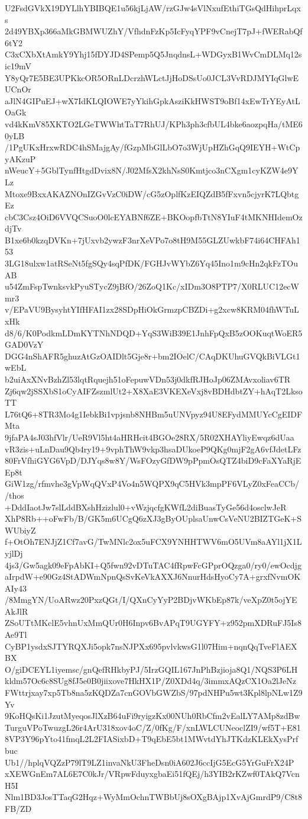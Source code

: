 U2FsdGVkX19DYLlhYBIBQE1u56kjLjAW/rzGJw4sVlNxufEthiTGsQdHihprLqxs
2d49YBXp366aMkGBMWUZhY/VfhdnFzKp5IcFyqYPF9vCnejT7pJ+fWERabQf6tY2
C3xCXbXtAmkY9Yhj15fDYJD4SPemp5Q5JnqdnsL+WDGyxB1WvCmDLMq12sic19mV
Y8yQr7E5BE3UPKkcOR5ORnLDcrzhWLctJjHoDSsUo0JCL3VvRDJMYIqGlwEUCnOr
aJlN4GIPuEJ+wX7IdKLQIOWE7yYkihGpkAsziKkHWST9oBf14xEwTrYEyAtLOaGk
vd4kKmV85XKTO2LGeTWWhtTaT7RhUJ/KPh3ph3cfbUL4bke6aozpqHa/tME60yLB
/1PgUKxHrxwRDC4hSMajgAy/fGzpMbGlLbO7o3WjUpHZhGqQ9IEYH+WtCpyAKzuP
nWeucY+5GblTynfHtgdDvix8N/J02MfsX2khNsS0Kmtjco3nCXgm1cyKZW4e9YLz
Mtoxe9BxxAKAZNOnIZGvVzC0iDW/cG5zOplfKzEIQZdB5fFxvn5cjyrK7LQbtgEz
cbC3Csz4OiD6VVQCSuoO0lcEYABNf6ZE+BKOopfbTtN8YIuF4tMKNHIdemOzdjTv
B1xe6b0kzqDVKn+7jUxvb2ywzF3nrXeVPo7o8tH9M55GLZUwkbF74i64CHFAh153
3LG18ulxw1atRSeNt5fgSQy4sqPfDK/FGHJvWYbZ6Yq45Ino1m9cHn2qkFzTOuAB
u54ZmFspTwnksvkPyuSTycZ9jBfO/26ZoQ1Kc/xIDm3O8PTP7/X0RLUC12ecWmr3
v/EPaVU9BysyhtYIfHFAI1zx28SDpHiOkGrmzpCBZDi+g2xcw8KRM04fhWTuLxHk
d8/6/K0PodkmLDmKYTNhNDQD+YqS3WiB39E1JnhFpQxB5zOOKuqtWoER5GAD0VzY
DGG4nShAFR5ghuzAtGzOAIDlt5Gje8r+bm2IOelC/CAqDKUhuGVQkBiVLGt1wEbL
b2uiAxXNvBzhZl53lqtRquejh51oFepuwVDn53j0dkfRJHoJp06ZMAvxoliav6TR
Zj6qw2jSSXbS1oCyAIFZszmlUt2+X8XaE3VKEXeVxj8vBDHdbtZY+hAqT2LksoTT
L76tQ6+8TR3Mo4g1IebkBi1vpjsnb8NHBm5uUNVpyz94U8EFydMMUYcCgEIDFMta
9jfaPA4sJ03hfVlr/UeR9Vl5ht4aHRHcit4BGOe28RX/5R02XHAYliyEwqz6dUaa
vR3zis+uLnDau9Qb4ry19+9vphThW9vkp3hsaDUkoeP9QKg0mjF2gA6vfJdetLFz
80FrVfhiGYG6VpD/DJYqs8w8Y/WsFOzyGfDW9pPpmOsQTZ4biD9cFaXYaRjEEp8t
GiW1zg/rfmvhe3gVpWqQVxP4Vo4n5WQPX9qC5HVk3mpPF6VLyZ0xFeaCCb//thos
+DddIaotJw7slLddBXshHzizlul0+vWzjqcfgKWfL2diBuasTyGe56d4osclwJeR
XhP8Rb++oFwFb/B/GK5m6UCgQ6zXJ3gByOUplsaUnwCsVeNU2BIZTGeK+SWUbiyZ
f+OtOh7ENJjZ1Cf7avG/TwMNlc2ox5uFCX9YNHHTWV6mO5UVm8aAYl1jX1LyjlDj
4js3/Gw5agk09eFpAbKI+Q5fwn92vDTuTAC4fRpwFcGPprOQzga0/ry0/ewOcdjg
aIrpdW+e90Gz4StADWmNpnQsSvKeVkAXXJ6NnurHdsHyoCy7A+grxfNvmOKAIy43
/8MmgYN/UoARwz20PxzQGt/I/QXnCyYyP2BDjvWKbEp87k/veXpZ0t5ojYEAkJlR
ZSoUTtMKclE5vhnUxMmQUr0H6Inpv6BvAPqT9UGYFY+z952pmXDRuFJ5Is8Ae9Tl
CyBP1ysdxSJTYRQXJi5opk7nsNJPXx695pvlvkwsG1l07Him+nqnQqTveFlAEXBX
O/giDCEYL1iyemsc/gnQefRHkbyPJ/5IrzGQIL167JnPhBzjioja8Q1/NQS3P6LH
kldm57Oc6c8SUg8fJ5e0B0jiixove7HkHX1P/Z0XDd4q/3immxAQzCX1Oa2lJeNz
FWttrjxay7xp5Tb8na5zKQDZa7cnGOVbGWZbS/97pdNHPu5wt3Kpl8lpNLw1Z9Yv
9KoHQsKi1JzutMyeqosJlXzB64uFi9ryigzKx00NUh0RbCfm2vEalLY7AMp8zdBw
TurguVPoTwuzgL26r4ArU318xov4oC/Z/0fKg/F/xnLWLCUNeoclZI9/wf5T+E81
8VP3Y96pYto41fmqL2L2FIASixbD+T9qEbE5bt1MWvtdYhJTKdzKLEkXysPrfbuc
Ub1//hplqVQZzP79lT9LZ1invaNkU3FheDsn0iA602J6ccIjG5EcG5YrGuFrX24P
xXEWGnEm7AL6E7C0kJr/VRpwFduyxgbaEi51fQEj/h3YIB2rKZwf0TAkQ7VcnH5I
Nlm1BD3JosTTaqG2Hqz+WyMmOchnTWBbUj8sOXgBAjp1XvAjGmrdP9/C8t8FB/ZD
